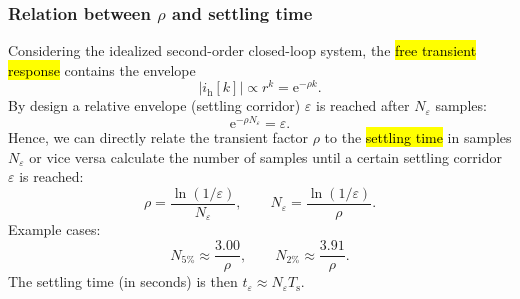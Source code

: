 \begin{frame}
    \frametitle{Relation between $\rho$ and settling time}
    Considering the idealized second-order closed-loop system, the \hl{free transient response} contains the envelope
    \begin{equation}
        |i_\mathrm{h}[k]|\propto r^k=\mathrm{e}^{-\rho k}.
    \end{equation}\pause%
    By design a relative envelope (settling corridor) $\varepsilon$ is reached after $N_\varepsilon$ samples:
    \begin{equation}
        \mathrm{e}^{-\rho N_\varepsilon}=\varepsilon.
    \end{equation}\pause%
    Hence, we can directly relate the transient factor $\rho$ to the \hl{settling time} in samples $N_\varepsilon$ or vice versa calculate the number of samples until a certain settling corridor $\varepsilon$ is reached:
    \begin{equation}
        \rho=\frac{\ln(1/\varepsilon)}{N_\varepsilon}, \qquad N_\varepsilon=\frac{\ln(1/\varepsilon)}{\rho}.
    \end{equation}\pause%
    Example cases:
    \begin{equation}
        N_{5\%}\approx\frac{3.00}{\rho},
        \qquad
        N_{2\%}\approx\frac{3.91}{\rho}.
    \end{equation}\pause%
    The settling time (in seconds) is then $t_\varepsilon\approx N_\varepsilon T_\mathrm{s}$.
\end{frame}

